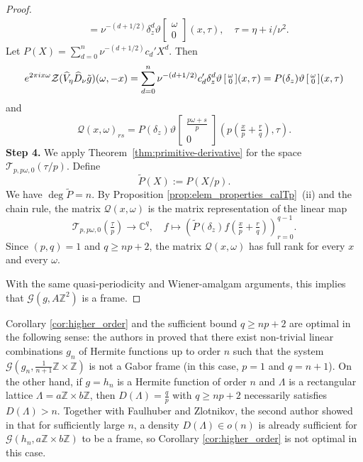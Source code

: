 \documentclass[reqno,a4paper,12pt]{amsart}
\numberwithin{equation}{section}
\newcommand{\Z}{\mathbb Z}
\newcommand{\C}{\mathbb C}
\newcommand{\calT}{\mathcal T}
\newcommand{\calG}{\mathcal G}
\newcommand{\dd}{\delta}
\newcommand{\QQ}{\mathcal{Q}}
\newcommand{\thetac}[2]{{\vartheta\left[\begin{smallmatrix}
        #1 \\ #2
    \end{smallmatrix}\right]}}
\newcommand{\zak}{\mathcal{Z}}
\begin{document}
\begin{proof}
\begin{equation}
\begin{split}
     & = \nu^{-(d+1/2)}\dd_z^d \thetac{\omega}{0}(x,\tau),\quad \tau = \eta+i/\nu^2.
\end{split}
\end{equation}
Let $P(X) = \sum_{d=0}^n \nu^{-(d+1/2)} c_d'X^d$. Then 
\begin{equation}
    e^{2\pi i x\omega }\zak (\widehat{V}_{\eta} \widehat{D}_{\nu}\Tilde{g})(\omega, -x) = \sum\limits_{d=0}^n \nu^{-(d+1/2)} c_d'\dd_z^d\thetac{\omega}{0}(x,\tau) = P(\dd_z)\thetac{\omega}{0}(x,\tau)
\end{equation}
and 
\begin{equation}
    \QQ(x,\omega)_{rs} = P(\dd_z)\thetac{\tfrac{p\omega+ s}{p}}{0}(p(\tfrac{x}{p}+\tfrac{r}{q}),\tau).
\end{equation}
\textbf{Step 4.}
We apply 
Theorem~\ref{thm:primitive-derivative} for the space $\calT_{p,p\omega,0}(\tau/p)$. 
Define
$$
\widetilde P(X):=P(X/p).
$$
We have $\deg \widetilde P=n$. By Proposition \ref{prop:elem_properties_calTp}~(ii)
and the chain rule, 
the matrix $\QQ(x,\omega)$ is the matrix representation of the linear map
\begin{equation}
    \calT_{p,p\omega ,0}(\tfrac{\tau}{p})\to \C^{q},\quad f \mapsto
\left(\widetilde P(\dd_z)f\left(\tfrac{x}{p}+\tfrac{r}{q}\right)\right)_{r=0}^{q-1}.
\end{equation}
Since $(p,q)=1$ and
$q\geq np+2$, the matrix $\QQ(x,\omega)$ has full rank for every $x$ and every
$\omega$.  

With the same quasi-periodicity and Wiener-amalgam arguments, this implies that $\calG(g,A\Z^2)$ is a frame.
\end{proof}
Corollary \ref{cor:higher_order} and the sufficient bound $q\geq np+2$ are optimal in the following sense: 
the authors in \cite{UlanovskiiZlotnikov2026} proved that there exist non-trivial linear combinations $g_n$ of Hermite functions up to order $n$ such that the system $\calG(g_n,\tfrac{1}{n+1}\Z\times\Z)$ is not a Gabor frame (in this case, $p=1$ and $q=n+1$). 
On the other hand, if $g=h_n$ is a Hermite function of order $n$ and $\Lambda$ is a rectangular lattice $\Lambda = a\Z\times b\Z$, then  $D(\Lambda)=\tfrac{q}{p}$ with $q\geq np+2$ necessarily satisfies $D(\Lambda)>n$. 
Together with Faulhuber and Zlotnikov, the second author showed
in \cite{FaulhuberShafkulovskaZlotnikov_part2}
that for sufficiently large $n$, a density $D(\Lambda)\in o(n)$ is already sufficient for  $\calG(h_n,a\Z\times b\Z)$ to be a frame, so Corollary \ref{cor:higher_order} is not optimal in this case.
\end{document}
